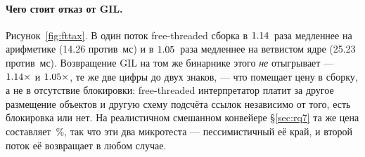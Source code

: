 \paragraph{Чего стоит отказ от GIL.} Рисунок~\ref{fig:fttax}. В один поток free-threaded сборка в
$\meas{ratio:b4_threads-ft:single_thread_arith/ft|b4_threads-gil:single_thread_arith/gil}{1.14}$~раза медленнее на арифметике (14.26 против \,мс) и в $\meas{ratio:b4_threads-ft:single_thread_branchy/ft|b4_threads-gil:single_thread_branchy/gil}{1.05}$~раза медленнее на
ветвистом ядре (25.23 против \,мс). Возвращение GIL на том же бинарнике этого \emph{не}
отыгрывает --- $\meas{ratio:b4_threads-ft_gil:single_thread_arith/ft_gil|b4_threads-gil:single_thread_arith/gil}{1.14}\times$ и $\meas{ratio:b4_threads-ft_gil:single_thread_branchy/ft_gil|b4_threads-gil:single_thread_branchy/gil}{1.05}\times$, те же две цифры до двух знаков, --- что помещает цену в
сборку, а не в отсутствие блокировки: free-threaded интерпретатор платит за другое размещение
объектов и другую схему подсчёта ссылок независимо от того, есть блокировка или нет. На
реалистичном смешанном конвейере \S\ref{sec:rq7} та же цена составляет \,\%, так что эти два
микротеста --- пессимистичный её край, и второй поток её возвращает в любом случае.

